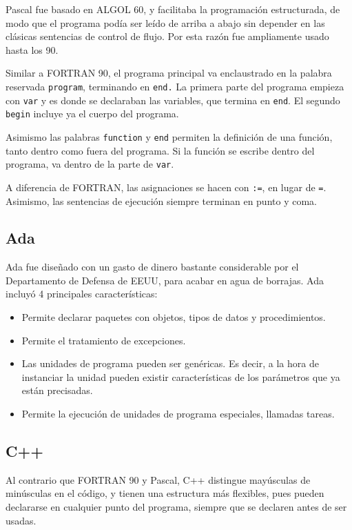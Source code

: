 \documentclass[a4paper]{article}
\begin{document}
	 Pascal fue basado en ALGOL 60, y facilitaba la programación estructurada, de modo que el programa podía ser leído de arriba a abajo sin depender en las clásicas sentencias de control de flujo. Por esta razón fue ampliamente usado hasta los 90.
	 
	 Similar a FORTRAN 90, el programa principal va enclaustrado en la palabra reservada \verb|program|, terminando en \verb|end.| La primera parte del programa empieza con \verb|var| y es donde se declaraban las variables, que termina en \verb|end|. El segundo \verb|begin| incluye ya el cuerpo del programa.
	 
	 Asimismo las palabras \verb|function| y \verb|end| permiten la definición de una función, tanto dentro como fuera del programa. Si la función se escribe dentro del programa, va dentro de la parte de \verb|var|.
	 
	 A diferencia de FORTRAN, las asignaciones se hacen con \verb|:=|, en lugar de \verb|=|. Asimismo, las sentencias de ejecución siempre terminan en punto y coma.
	 
	 \subsection{Ada}
	 
	 Ada fue diseñado con un gasto de dinero bastante considerable por el Departamento de Defensa de EEUU, para acabar en agua de borrajas. Ada incluyó 4 principales características:
	 \begin{itemize}
	 	\item Permite declarar paquetes con objetos, tipos de datos y procedimientos.
	 	\item Permite el tratamiento de excepciones.
	 	\item Las unidades de programa pueden ser genéricas. Es decir, a la hora de instanciar la unidad pueden existir características de los parámetros que ya están precisadas.
	 	\item Permite la ejecución de unidades de programa especiales, llamadas tareas.
	 \end{itemize}
	 
	 
	 \subsection{C++}
	 
	 Al contrario que FORTRAN 90 y Pascal, C++ distingue mayúsculas de minúsculas en el código, y tienen una estructura más flexibles, pues pueden declararse en cualquier punto del programa, siempre que se declaren antes de ser usadas.
	 
\end{document}
